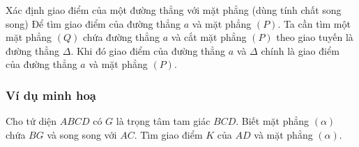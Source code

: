 \begin{dang}{Xác định giao điểm của một đường thẳng với mặt phẳng (dùng tính chất song song)}
	Để tìm giao điểm của đường thẳng $a$ và mặt phẳng $(P)$. Ta cần tìm một mặt phẳng $(Q)$ chứa đường thẳng $a$ và cắt mặt phẳng $(P)$ theo giao tuyến là đường thẳng $\Delta$. Khi đó giao điểm của đường thẳng $a$ và $\Delta$ chính là giao điểm của đường thẳng $a$ và mặt phẳng $(P)$.	
\end{dang}
\subsubsection{Ví dụ minh hoạ}
\begin{vd}%
	Cho tứ diện $ABCD$ có $G$ là trọng tâm tam giác $BCD$. Biết mặt phẳng $(\alpha)$ chứa $BG$ và song song với $AC$. Tìm giao điểm $K$ của $AD$ và mặt phẳng $(\alpha)$.
\end{vd}

